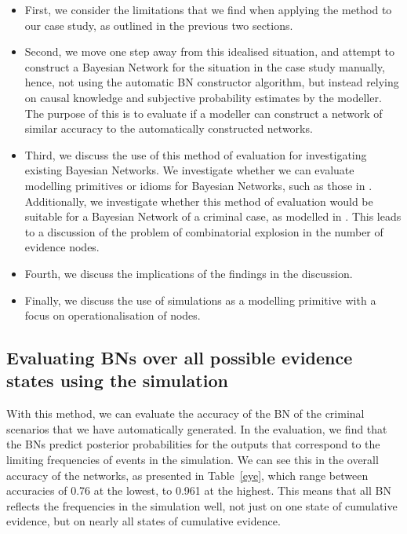 \documentclass[12pt]{article}
\begin{document}
\begin{itemize}
\item First, we consider the limitations that we find when applying the method to our case study, as outlined in the previous two sections. 
\item Second, we move one step away from this idealised situation, and attempt to construct a Bayesian Network for the situation in the case study manually, hence, not using the automatic BN constructor algorithm, but instead relying on causal knowledge and subjective probability estimates by the modeller. The purpose of this is to evaluate if a modeller can construct a network of similar accuracy to the automatically constructed networks. 
\item Third, we discuss the use of this method of evaluation for investigating existing Bayesian Networks. We investigate whether we can evaluate modelling primitives or idioms for Bayesian Networks, such as those in \citep{deZoete2019}. Additionally, we investigate whether this method of evaluation would be suitable for a Bayesian Network of a criminal case, as modelled in \citep{vanLeeuwen2019}. This leads to a discussion of the problem of combinatorial explosion in the number of evidence nodes.
\item Fourth, we discuss the implications of the findings in the discussion.
\item Finally, we discuss the use of simulations as a modelling primitive with a focus on operationalisation of nodes.

\end{itemize}


\subsection{Evaluating BNs over all possible evidence states using the simulation}

With this method, we can evaluate the accuracy of the BN of the criminal scenarios that we have automatically generated. In the evaluation, we find that the BNs predict posterior probabilities for the outputs that correspond to the limiting frequencies of events in the simulation. We can see this in the overall accuracy of the networks, as presented in Table~\ref{eye}, which range between accuracies of 0.76 at the lowest, to 0.961 at the highest. This means that all BN reflects the frequencies in the simulation well, not just on one state of cumulative evidence, but on nearly all states of cumulative evidence. 
\end{document}
